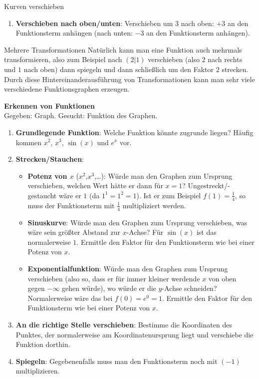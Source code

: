 \begin{bla}{Kurven verschieben}
\begin{enumerate}
    \item \textbf{Verschieben nach oben/unten}: Verschieben um $3$ nach oben: $+3$ an den Funktionsterm anhängen (nach unten: $-3$ an den Funktionsterm anhängen).
  \end{enumerate}
\end{bla}

\begin{bla}{Mehrere Transformationen}
  Natürlich kann man eine Funktion auch mehrmals transformieren, also zum Beispiel nach $(2|1)$ verschieben (also $2$ nach rechts und $1$ nach oben) dann spiegeln und dann schließlich um den Faktor $2$ strecken. Durch diese Hintereinanderausführung von Transformationen kann man sehr viele verschiedene Funktionsgraphen erzeugen.
\end{bla}

\begin{koch}
  \textbf{Erkennen von Funktionen} \\
  Gegeben: Graph. Gesucht: Funktion des Graphen.
  \begin{enumerate}
    \item \textbf{Grundlegende Funktion}: Welche Funktion könnte zugrunde liegen? Häufig kommen $x^2$, $x^3$, $\sin(x)$ und $e^x$ vor.
    \item \textbf{Strecken/Stauchen}:
      \begin{itemize}
        \item \textbf{Potenz von $x$} ($x^2$,$x^3$,\dots): Würde man den Graphen zum Ursprung verschieben, welchen Wert hätte er dann für $x=1$? Ungestreckt/-gestaucht wäre er $1$ (da $1^1=1^2=1$). Ist er zum Beispiel $f(1)=\frac{1}{4}$, so muss der Funktionsterm mit $\frac{1}{4}$ multipliziert werden.
        \item \textbf{Sinuskurve}: Würde man den Graphen zum Ursprung verschieben, was wäre sein größter Abstand zur $x$-Achse? Für $\sin(x)$ ist das normalerweise $1$. Ermittle den Faktor für den Funktionsterm wie bei einer Potenz von $x$.
        \item \textbf{Exponentialfunktion}: Würde man den Graphen zum Ursprung verschieben (also so, dass er für immer kleiner werdende $x$ von oben gegen $-\infty$ gehen würde), wo würde er die $y$-Achse schneiden? Normalerweise wäre das bei $f(0)=e^0=1$. Ermittle den Faktor für den Funktionsterm wie bei einer Potenz von $x$.
      \end{itemize}
    \item \textbf{An die richtige Stelle verschieben}: Bestimme die Koordinaten des Punktes, der normalerweise am Koordinatenursprung liegt und verschiebe die Funktion dorthin.
    \item \textbf{Spiegeln}: Gegebenenfalls muss man den Funktionsterm noch mit $(-1)$ multiplizieren.
  \end{enumerate}
\end{koch}

